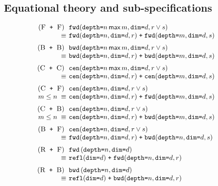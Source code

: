 \documentclass[9pt,preprint]{sigplanconf}
\theoremstyle{definition}
\newcommand{\term}[1]{\texttt{#1}}
\newcommand{\stenFwdS}[2]{\term{fwd} \, (\term{depth=}#1,
  \term{dim=}#2)}
\newcommand{\stenBwdS}[2]{\term{bwd} \, (\term{depth=}#1,
  \term{dim=}#2)}
\newcommand{\stenFwdSR}[3]{\term{fwd} (\term{depth=}#1,
  \term{dim=}#2, #3)}
\newcommand{\stenBwdSR}[3]{\term{bwd} (\term{depth=}#1,
  \term{dim=}#2, #3)}
\newcommand{\stenCenSR}[3]{\term{cen} (\term{depth=}#1,
  \term{dim=}#2, #3)}
\newcommand{\stenReflSR}[1]{\term{refl} (\term{dim=}#1)}
\begin{document}
\subsection{Equational theory and sub-specifications}
\label{sec:eqs}

\begin{figure}
\begin{align*}
\setlength{\arraycolsep}{0.05em}
\begin{array}{c}
\begin{array}{rll}
(\textsc{F\, \texttt{+} \,F}) \;\; &
\stenFwdSR{n \, \textsf{max} \, m}{d}{r \vee s} \\
 \equiv \; & \stenFwdSR{n}{d}{r} \; \texttt{+} \; \stenFwdSR{m}{d}{s} \\[0.6em]
%
%
(\textsc{B\, \texttt{+} \,B}) \;\; &
\stenBwdSR{n \, \textsf{max} \, m}{d}{r \vee s} \\
 \equiv \; & \stenBwdSR{n}{d}{r} \; \texttt{+} \; \stenBwdSR{m}{d}{s} \\[0.6em]
%
%
(\textsc{C\, \texttt{+} \,C}) \;\; &
\stenCenSR{n \, \textsf{max} \, m}{d}{r \vee s} \\
\equiv \; & \stenCenSR{n}{d}{r} \; \texttt{+} \; \stenCenSR{m}{d}{s} \\[0.6em]
%
%
(\textsc{C\, \texttt{+} \,F}) \;\; & \stenCenSR{n}{d}{r \vee s} \\
\textit{$m \leq n$} \; \equiv \; & \stenCenSR{n}{d}{r} \; \texttt{+} \;
                      \stenFwdSR{m}{d}{s} \\[0.6em]
%
%
(\textsc{C\, \texttt{+} \,B}) \;\; &
\stenCenSR{n}{d}{r \vee s} \\
\textit{$m \leq n$} \; \equiv \; & \stenCenSR{n}{d}{r} \; \texttt{+} \;
                      \stenBwdSR{m}{d}{s} \\[0.6em]
%
%
(\textsc{B\, \texttt{+} \,F}) \;\; &
\stenCenSR{n}{d}{r \vee s} \\
\equiv \; & \stenFwdSR{n}{d}{r} \; \texttt{+} \; \stenBwdSR{n}{d}{s}
  \\[0.6em]
%
%
(\textsc{R\, \texttt{+} \,F}) \;\; &
\stenFwdS{n}{d} \\
\equiv \; & \stenReflSR{d} \; \texttt{+} \; \stenFwdSR{n}{d}{r} \\[0.6em]
%
%
(\textsc{R\, \texttt{+} \,B}) \;\; &
\stenBwdS{n}{d} \\
\equiv \; & \stenReflSR{d} \; \texttt{+} \; \stenBwdSR{n}{d}{r} \\[0.6em]

\end{array}
\end{array}
\end{align*}
\end{figure}
\end{document}

